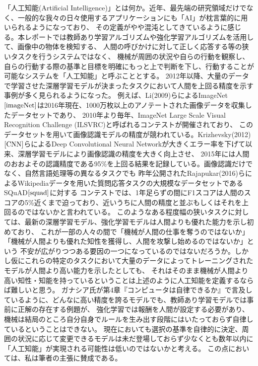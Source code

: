 \documentclass[uplatex]{jsarticle}
\begin{document}
「人工知能(Artificial Intelligence)」とは何か。近年、最先端の研究領域だけでなく、一般的な我々の日々使用するアプリケーションにも「AI」が枕言葉的に用いられるようになっており、
その定義がやや混沌としてきているように感じる。本レポートでは教師あり学習アルゴリズムや強化学習アルゴリズムを活用して、画像中の物体を検知する、
人間の呼びかけに対して正しく応答する等の狭いタスクを行うシステムではなく、
機械が周囲の状況や自らの行動を観察し、自らの行動する際の基準と目標を明確にもっと上で判断を下し、行動することが可能なシステムを「人工知能」と呼ぶこととする。
2012年以降、大量のデータで学習させた深層学習モデルが決まったタスクにおいて人間を上回る精度を示す事例が多く見られるようになった。
例えば、Li(2009)らによるImageNet$\cite{imageNet}$は2016年現在、1000万枚以上のアノテートされた画像データを収集したデータセットであり、
2010年より毎年、ImageNet Large Scale Visual Recognition Challenge (ILSVRC)と呼ばれるコンテストが開催されており、
このデータセットを用いて画像認識モデルの精度が競われている。Krizhevsky(2012)$\cite{CNN}$らによるDeep Convolutional Neural Networkが大きくエラー率を下げて以来、深層学習モデルにより画像認識の精度を大きく向上させ、
2015年には人間のおおよその認識精度である95\%を上回る結果を記録している。画像認識だけでなく、自然言語処理等の異なるタスクでも
昨年公開されたRajapukar(2016)らによるWikipediaデータを用いた質問応答タスクの大規模なデータセットであるSQuAD$\cite{squad}$に対する
コンテストでは、1年足らずの間にF1スコアは人間のスコアの5\%近くまで迫っており、近いうちに人間の精度と並ぶもしくはそれを上回るのではないかと言われている。
このようなある程度幅の狭いタスクに対しては、最新の深層学習モデル、強化学習モデルは人間よりも優れた能力を示し初めており、
これが一部の人々の間で「機械が人間の仕事を奪うのではないか」「機械が人間よりも優れた知性を獲得し、人間を攻撃し始めるのではないか」という
不安が広がりつつある要因の一つになっているのではないだろうか。しかし仮にこれらの特定のタスクにおいて大量のデータによってトレーニングされたモデルが人間より高い能力を示したとしても、
それはそのまま機械が人間より高い知性・知能を持っているということは上述のように人工知能を定義するならば難しいと思う。
ガナシア氏が第4章『コンピュータは自律できるか』で言及しているように、どんなに高い精度を誇るモデルでも、教師あり学習モデルでは事前に正解の存在する例題が、
強化学習では報酬を人間が設定する必要があり、機械は結局のところ自分自身でルールを生み出す段階にはいたっておらず自律しているということはできない。
現在においても選択の基準を自律的に決定、周囲の状況に応じて変更できるモデルは未だ登場しておらず少なくとも数年以内に「人工知能」が実現される可能性は低いのではないかと考える。
この点においては、私は筆者の主張に賛成である。
\end{document}
